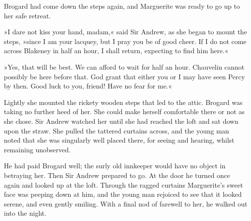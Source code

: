 Brogard had come down the steps again, and Marguerite was ready to go up to her safe retreat.

»I dare not kiss your hand, madam,« said Sir Andrew, as she began to mount the steps, »since I am your lacquey, but I pray you be of good cheer. If I do not come across Blakeney in half an hour, I shall return, expecting to find him here.«

»Yes, that will be best. We can afford to wait for half an hour. Chauvelin cannot possibly be here before that. God grant that either you or I may have seen Percy by then. Good luck to you, friend! Have no fear for me.«

Lightly she mounted the rickety wooden steps that led to the attic. Brogard was taking no further heed of her. She could make herself comfortable there or not as she chose. Sir Andrew watched her until she had reached the loft and sat down upon the straw. She pulled the tattered curtains across, and the young man noted that she was singularly well placed there, for seeing and hearing, whilst remaining unobserved.

He had paid Brogard well; the surly old innkeeper would have no object in betraying her. Then Sir Andrew prepared to go. At the door he turned once again and looked up at the loft. Through the ragged curtains Marguerite's sweet face was peeping down at him, and the young man rejoiced to see that it looked serene, and even gently smiling. With a final nod of farewell to her, he walked out into the night.
